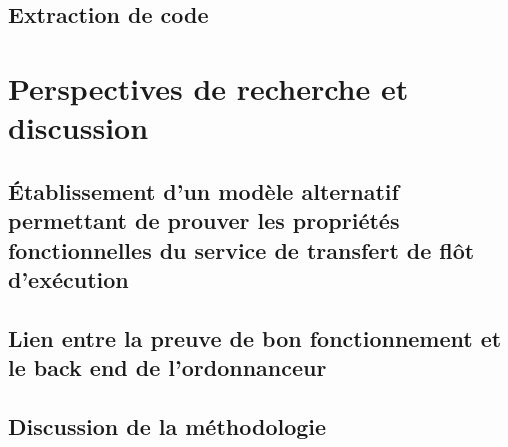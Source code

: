 		\subsection{Extraction de code}


	\section{Perspectives de recherche et discussion}
		\subsection{Établissement d'un modèle alternatif permettant de prouver les propriétés fonctionnelles du service de transfert de flôt d'exécution}
		\subsection{Lien entre la preuve de bon fonctionnement et le back end de l'ordonnanceur}
		\subsection{Discussion de la méthodologie}
